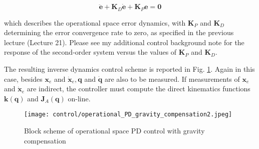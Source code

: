 \documentclass[10pt]{article}
\begin{document}
$$
\ddot{{\boldsymbol{e}}}+\boldsymbol{K}_{D} \dot{{\boldsymbol{e}}}+\boldsymbol{K}_{P} {\boldsymbol{e}}=\mathbf{0}
$$

which describes the operational space error dynamics, with $\boldsymbol{K}_{P}$ and $\boldsymbol{K}_{D}$ determining the error convergence rate to zero, as specified in the previous lecture (Lecture 21). Please see my additional control background note for the response of the second-order system versus the values of  $\boldsymbol{K}_{P}$ and $\boldsymbol{K}_{D}$.



The resulting inverse dynamics control scheme is reported in Fig. \ref{fig:44}. Again in this case, besides $\boldsymbol{x}_{e}$ and $\dot{\boldsymbol{x}}_{e}, \boldsymbol{q}$ and $\dot{\boldsymbol{q}}$ are also to be measured. If measurements of $\boldsymbol{x}_{e}$ and $\dot{\boldsymbol{x}}_{e}$ are indirect, the controller must compute the direct kinematics functions $\boldsymbol{k}(\boldsymbol{q})$ and $\boldsymbol{J}_{A}(\boldsymbol{q})$ on-line.

\begin{figure}[H]
    \centering
    \texttt{[image: control/operational\_PD\_gravity\_compensation2.jpeg]}
    \caption{Block scheme of operational space PD control with gravity compensation}
    \label{fig:44}
\end{figure}
\end{document}
